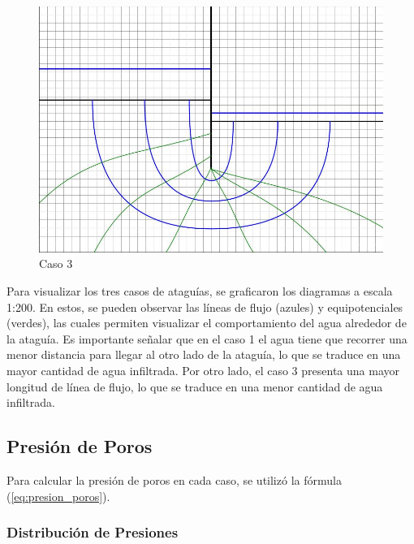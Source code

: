 \begin{figure}[H]
\begin{minipage}{0.32\textwidth}
        \includegraphics[width=\textwidth]{GRAFICOS/caso_3.jpg}
        \caption{Caso 3}
        \label{fig:caso_3}
    \end{minipage}
  \end{figure}

Para visualizar los tres casos de ataguías, se graficaron los diagramas a escala 1:200. En estos, se pueden observar las líneas de flujo (azules) y equipotenciales (verdes), las cuales permiten visualizar el comportamiento del agua alrededor de la ataguía. Es importante señalar que en el caso 1 el agua tiene que recorrer una menor distancia para llegar al otro lado de la ataguía, lo que se traduce en una mayor cantidad de agua infiltrada. Por otro lado, el caso 3 presenta una mayor longitud de línea de flujo, lo que se traduce en una menor cantidad de agua infiltrada.

\subsection{Presión de Poros}
Para calcular la presión de poros en cada caso, se utilizó la fórmula (\ref{eq:presion_poros}). 

\subsubsection{Distribución de Presiones}

